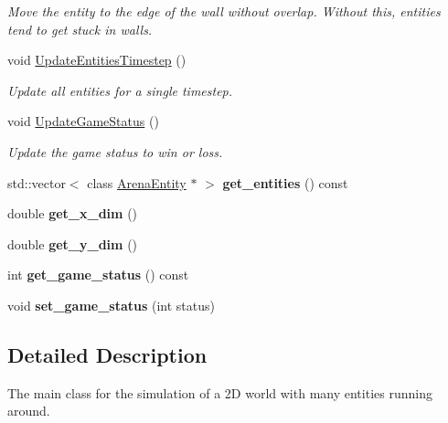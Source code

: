 \begin{DoxyCompactItemize}
\begin{DoxyCompactList}\small\item\em Move the entity to the edge of the wall without overlap. Without this, entities tend to get stuck in walls. \end{DoxyCompactList}\item 
void \hyperlink{classArena_a682ec81cb30e36e5bb801b3388bcb494}{Update\+Entities\+Timestep} ()
\begin{DoxyCompactList}\small\item\em Update all entities for a single timestep. \end{DoxyCompactList}\item 
void \hyperlink{classArena_a700c436c43cd6c692b0e357dac94c507}{Update\+Game\+Status} ()
\begin{DoxyCompactList}\small\item\em Update the game status to win or loss. \end{DoxyCompactList}\item 
std\+::vector$<$ class \hyperlink{classArenaEntity}{Arena\+Entity} $\ast$ $>$ {\bfseries get\+\_\+entities} () const \hypertarget{classArena_aabb4ffe05aefc71ee10d47b191963fe5}{}\label{classArena_aabb4ffe05aefc71ee10d47b191963fe5}

\item 
double {\bfseries get\+\_\+x\+\_\+dim} ()\hypertarget{classArena_a5e3be20f2c67338a5a684b85a66f6b96}{}\label{classArena_a5e3be20f2c67338a5a684b85a66f6b96}

\item 
double {\bfseries get\+\_\+y\+\_\+dim} ()\hypertarget{classArena_a35737d65ff32f2bd5871f0bdfbc10a85}{}\label{classArena_a35737d65ff32f2bd5871f0bdfbc10a85}

\item 
int {\bfseries get\+\_\+game\+\_\+status} () const \hypertarget{classArena_a6d196837daa08a2618c3ff6e0a741b25}{}\label{classArena_a6d196837daa08a2618c3ff6e0a741b25}

\item 
void {\bfseries set\+\_\+game\+\_\+status} (int status)\hypertarget{classArena_ac8e8b3438db02aa5395f7fcb537ed952}{}\label{classArena_ac8e8b3438db02aa5395f7fcb537ed952}

\end{DoxyCompactItemize}


\subsection{Detailed Description}
The main class for the simulation of a 2D world with many entities running around. 

